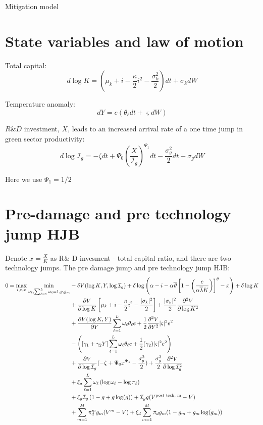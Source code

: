 \documentclass[12pt]{article}
\begin{document}
	\begin{center}
	{\Large Mitigation model}	
	\end{center}
	
	\section{State variables and law of motion}
	
	Total capital:
	$$
	d \log K = (\mu_k + i - \frac{\kappa}{2} i^2 - \frac{\sigma_k^2}{2}) dt + \sigma_k dW
	$$
	
	Temperature anomaly:
	$$
	d Y = e(\theta_\ell dt + \varsigma dW)
	$$
	
	$R\& D$ investment, $X$, leads to an increased arrival rate of a one time jump in green sector productivity:
	$$
	d\log \mathcal{I}_g = - \zeta dt + \Psi_0 (\frac{X}{\mathcal{I}_g})^{\Psi_1} dt - \frac{\sigma_g^2}{2} dt + \sigma_g dW 
	$$
	
	Here we use $\Psi_1 = 1/2$
	\section{Pre-damage and pre technology jump HJB}
	Denote $x = \frac{X}{K}$ as R\& D invesment - total capital ratio, and there are two technology jumps. The pre damage jump and pre technology jump HJB:
	\begin{align*} 
		0 = \max_{i,e,x} \min_{\omega_\ell, \sum_{\ell = 1}^L \omega_\ell = 1, g, g_m } &   - \delta V(\log K,Y, \log \mathcal{I}_g) +  \delta \log \left( \alpha - i -  \alpha \overline{\vartheta} \left[ 1 - \left(\frac {e} { \alpha \overline\lambda K} \right) \right]^\theta  - x \right) + \delta\log K \cr 
		& + \frac {\partial V}{\partial \log K} 
		\left[ \mu_k    + i   -
		{\frac { \kappa} 2} i^2  -  \frac  {|\sigma_k|^2}  2\right]  + \frac {|\sigma_k|^2} 2  \frac {\partial^2 V}{\partial \log K^2} \cr
		& + \frac {\partial  V(\log K,Y)}{\partial Y}  \sum_{\ell=1}^L \omega_\ell  \theta_\ell {e} + {\frac 1 2} \frac {\partial^2 V}{\partial Y^2} |\varsigma|^2 e^2  \cr
		& - \left( \left[ \gamma_1 + \gamma_2 Y\right]   \sum_{\ell=1}^L \omega_\ell \theta_\ell { e} + {\frac 1 2} (\gamma_2 ) |\varsigma|^2  e^2 \right) \cr
		& + \frac{\partial V}{\partial \log \mathcal{I}_g} (- \zeta + \Psi_0 x^{\Psi_1} - \frac{\sigma_g^2}{2} ) + \frac{\sigma_g^2}{2}\frac{\partial^2 V}{\partial \log \mathcal{I}_g^2} \\
		& + \xi_a \sum_{\ell = 1}^L \omega_\ell \left( \log \omega_\ell - \log \pi_\ell \right) \\
		& + \xi_g \mathcal{I}_g \left(1 - g + g  \log(g) \right) + \mathcal{I}_g g (V^{\text{post tech, m}} - V )\\
		& + \sum_{m=1}^M \pi_d^m g_m (V^m - V) + \xi_d \sum_{m=1}^M \pi_d g_m (1 - g_m + g_m \log(g_m))
	\end{align*} 
	
\end{document}
